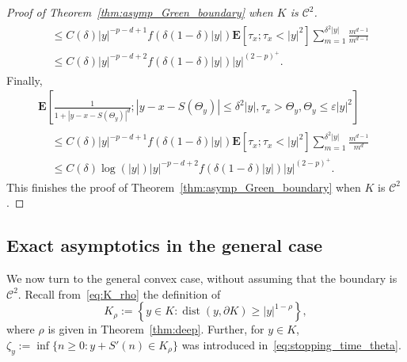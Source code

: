 \documentclass[AHL,Unicode,longabstracts,published]{cedram}
\DeclareMathOperator{\dist}{dist}
\newcommand{\clC}{\mathcal{C}}
\newcommand{\e}{\mathbf{E}}
\renewcommand{\le}{\leqslant}
\renewcommand{\geq}{\geqslant}
\begin{document}
\begin{proof}[Proof of Theorem~\ref{thm:asymp_Green_boundary} when $K$ is $\clC^{2}$]
\begin{multline*}
\begin{aligned}
&\le C(\delta)|y|^{-p-d+1}f\left(\delta\left(1-\delta\right)|y|\right)\e\left[\tau_x;\tau_x<|y|^2\right]\sum_{m=1}^{\delta^2|y|}\frac{m^{d-1}}{m^{d-1}}\\
& \le C(\delta)|y|^{-p-d+2}f\left(\delta(1-\delta)|y|\right)|y|^{(2-p)^+}.
\end{aligned}
\end{multline*}
Finally,
\begin{multline*}
\e\left[\frac{1}{1+\left|y-x-S\left(\Theta_y\right)\right|^{d}};\left|y-x-S\left(\Theta_y\right)\right|\le\delta^2|y|,\tau_x>\Theta_y,\Theta_y\le\varepsilon|y|^2\right]\\
\begin{aligned}
&\le C(\delta)|y|^{-p-d+1}f\left(\delta(1-\delta)|y|\right)\e\left[\tau_x;\tau_x<|y|^2\right]\sum_{m=1}^{\delta^2|y|}\frac{m^{d-1}}{m^{d}}\\
& \le C(\delta)\log(|y|)|y|^{-p-d+2}f\left(\delta(1-\delta)|y|\right)|y|^{(2-p)^+}.
\end{aligned}
\end{multline*}
This finishes the proof of Theorem~\ref{thm:asymp_Green_boundary} when $K$ is $\clC^{2}$.
\end{proof}

\subsection*{Exact asymptotics in the general case}

We now turn to the general convex case, without assuming that the boundary is $\clC^2$. Recall from~\eqref{eq:K_rho} the definition of
\[
{K}_{\rho}:=\left\{y\in{K}:\dist(y,\partial {K})\geq | y|^{1-\rho}\right\},
\]
where $\rho$ is given in Theorem~\ref{thm:deep}. Further, for $y\in{K}$, $\zeta_{y}:=\inf\{n\geq 0:y+S'(n)\in{K}_{\rho}\}$ was introduced in~\eqref{eq:stopping_time_theta}.
\end{document}
